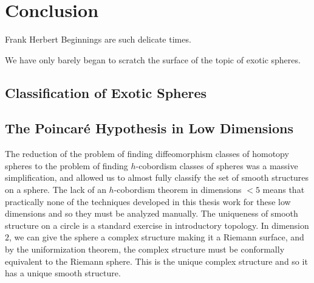 \chapter{Conclusion}\label{chap:conclusion}

\begin{epigraph}{10em}{Frank Herbert}
	Beginnings are such delicate times.
\end{epigraph}

We have only barely began to scratch the surface of the topic of exotic spheres.

\section{Classification of Exotic Spheres}\label{sec:classification}

\section{The Poincar\'e Hypothesis in Low Dimensions}\label{sec:low-dimensions}

The reduction of the problem of finding diffeomorphism classes of homotopy spheres to the problem of finding $h$-cobordism classes of spheres was a massive simplification, and allowed us to almost fully classify the set of smooth structures on a sphere.
The lack of an $h$-cobordism theorem in dimensions $<5$ means that practically none of the techniques developed in this thesis work for these low dimensions and so they must be analyzed manually. The uniqueness of smooth structure on a circle is a standard exercise in introductory topology. In dimension $2$, we can give the sphere a complex structure making it a Riemann surface, and by the uniformization theorem, the complex structure must be conformally equivalent to the Riemann sphere. This is the unique complex structure and so it has a unique smooth structure.


